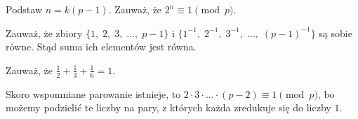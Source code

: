 

\begin{hints_list}
	\item Podstaw $n = k(p - 1)$. Zauważ, że $2^n \equiv 1 \pmod{p}$. 
	\item Zauważ, że zbiory $\{1, \; 2, \; 3, \; ..., \; p - 1\} $ i $\{1^{-1},\; 2^{-1},\; 3^{-1},\; ..., \;(p - 1)^{-1}\}$ są sobie równe. Stąd suma ich elementów jest równa.
	\item Zauważ, że $\frac{1}{2} + \frac{1}{3} + \frac{1}{6} = 1$.
	\item Skoro wspomniane parowanie istnieje, to 
	$
		2 \cdot 3 \cdot ... \cdot (p - 2) \equiv 1 \pmod{p}
	$,
	bo możemy podzielić te liczby na pary, z których każda zredukuje się do liczby $1$.
\end{hints_list}